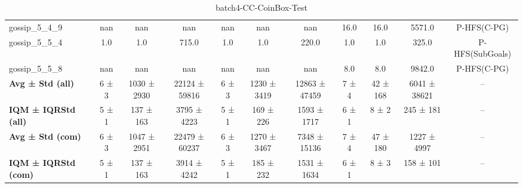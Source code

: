 \begin{table}[!ht]
\begin{tabular}{l|ccc|ccc|cccc}
gossip\_5\_4\_9 & nan & nan & nan & nan & nan & nan & 16.0 & 16.0 & 5571.0 & P-HFS(C-PG) \\
gossip\_5\_5\_4 & 1.0 & 1.0 & 715.0 & 1.0 & 1.0 & 220.0 & 1.0 & 1.0 & 325.0 & P-HFS(SubGoals) \\
gossip\_5\_5\_8 & nan & nan & nan & nan & nan & nan & 8.0 & 8.0 & 9842.0 & P-HFS(C-PG) \\
\hline
\textbf{Avg ± Std (all)} & 6 ± 3 & 1030 ± 2930 & 22124 ± 59816 & 6 ± 3 & 1230 ± 3419 & 12863 ± 47459 & 7 ± 4 & 42 ± 168 & 6041 ± 38621 & -- \\
\textbf{IQM ± IQRStd (all)} & 5 ± 1 & 137 ± 163 & 3795 ± 4223 & 5 ± 1 & 169 ± 226 & 1593 ± 1717 & 6 ± 1 & 8 ± 2 & 245 ± 181 & -- \\
\textbf{Avg ± Std (com)} & 6 ± 3 & 1047 ± 2951 & 22479 ± 60237 & 6 ± 3 & 1270 ± 3467 & 7348 ± 15136 & 7 ± 4 & 47 ± 180 & 1227 ± 4997 & -- \\
\textbf{IQM ± IQRStd (com)} & 5 ± 1 & 137 ± 163 & 3914 ± 4242 & 5 ± 1 & 185 ± 232 & 1531 ± 1634 & 6 ± 1 & 8 ± 3 & 158 ± 101 & -- \\
\end{tabular}
\caption{batch4-CC-CoinBox-Test}
\label{tab:batch4_CC-CoinBox_comparison_test}
\end{table}
